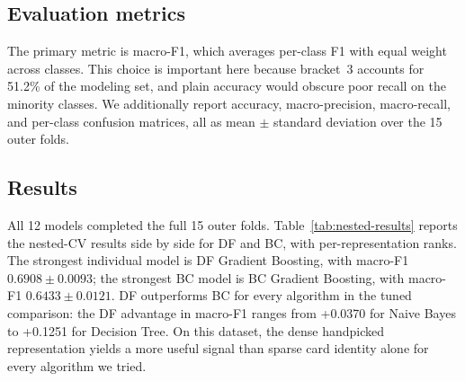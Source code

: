 \documentclass{article}
\begin{document}
\subsection{Evaluation metrics}
\label{sec:training:metrics}

The primary metric is macro-F1, which averages per-class F1 with equal weight across classes. This choice is important here because bracket~3 accounts for 51.2\% of the modeling set, and plain accuracy would obscure poor recall on the minority classes. We additionally report accuracy, macro-precision, macro-recall, and per-class confusion matrices, all as mean $\pm$ standard deviation over the 15 outer folds.

\subsection{Results}
\label{sec:training:results}

All 12 models completed the full 15 outer folds. Table~\ref{tab:nested-results} reports the nested-CV results side by side for DF and BC, with per-representation ranks. The strongest individual model is DF Gradient Boosting, with macro-F1 \(0.6908 \pm 0.0093\); the strongest BC model is BC Gradient Boosting, with macro-F1 \(0.6433 \pm 0.0121\). DF outperforms BC for every algorithm in the tuned comparison: the DF advantage in macro-F1 ranges from +0.0370 for Naive Bayes to +0.1251 for Decision Tree. On this dataset, the dense handpicked representation yields a more useful signal than sparse card identity alone for every algorithm we tried.
\end{document}
